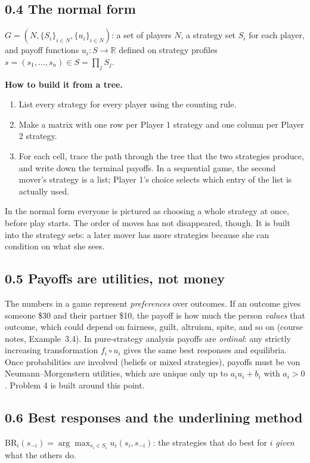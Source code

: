 \documentclass[11pt]{article}
\newcommand{\BR}{\mathrm{BR}}
\begin{document}
\subsection*{0.4 The normal form}
\begin{keyidea}
$G=(N,\{S_i\}_{i\in N},\{u_i\}_{i\in N})$: a set of players $N$, a strategy set $S_i$ for each player, and payoff functions $u_i:S\to\mathbb{R}$ defined on strategy profiles $s=(s_1,\dots,s_n)\in S=\prod_j S_j$.
\end{keyidea}
\textbf{How to build it from a tree.}
\begin{enumerate}
\item List every strategy for every player using the counting rule.
\item Make a matrix with one row per Player 1 strategy and one column per Player 2 strategy.
\item For each cell, trace the path through the tree that the two strategies produce, and write down the terminal payoffs. In a sequential game, the second mover's strategy is a list; Player 1's choice selects which entry of the list is actually used.
\end{enumerate}
In the normal form everyone is pictured as choosing a whole strategy at once, before play starts. The order of moves has not disappeared, though. It is built into the strategy sets: a later mover has more strategies because she can condition on what she sees.

\subsection*{0.5 Payoffs are utilities, not money}
The numbers in a game represent \emph{preferences} over outcomes. If an outcome gives someone \$30 and their partner \$10, the payoff is how much the person \emph{values} that outcome, which could depend on fairness, guilt, altruism, spite, and so on (course notes, Example~3.4). In pure-strategy analysis payoffs are \emph{ordinal}: any strictly increasing transformation $f_i\circ u_i$ gives the same best responses and equilibria. Once probabilities are involved (beliefs or mixed strategies), payoffs must be von Neumann--Morgenstern utilities, which are unique only up to $a_iu_i+b_i$ with $a_i>0$. Problem 4 is built around this point.

\subsection*{0.6 Best responses and the underlining method}
$\BR_i(s_{-i})=\arg\max_{s_i\in S_i}u_i(s_i,s_{-i})$: the strategies that do best for $i$ \emph{given} what the others do.
\end{document}
